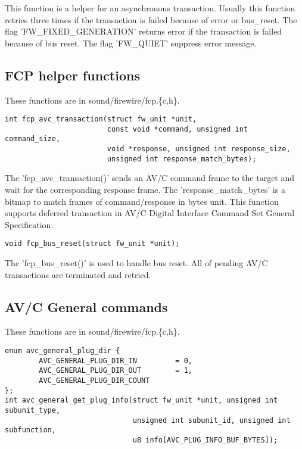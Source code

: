 \documentclass[onecolumn]{article}
\begin{document}
This function is a helper for an asynchronous transaction. Usually this function retries three times if the transaction is failed because of error or bus\_reset. The flag 'FW\_FIXED\_GENERATION' returns error if the transaction is failed because of bus reset. The flag 'FW\_QUIET' suppress error message.

\subsection{FCP helper functions}

These functions are in sound/firewire/fcp.\{c,h\}.

\begin{verbatim}
int fcp_avc_transaction(struct fw_unit *unit,
                        const void *command, unsigned int command_size,
                        void *response, unsigned int response_size,
                        unsigned int response_match_bytes);
\end{verbatim}

The 'fcp\_avc\_transaction()' sends an AV/C command frame to the target and wait for the corresponding response frame. The 'response\_match\_bytes' is a bitmap to match frames of command/response in bytes unit. This function supports deferred transaction in AV/C Digital Interface Command Set General Specification.

\begin{verbatim}
void fcp_bus_reset(struct fw_unit *unit);
\end{verbatim}

The 'fcp\_bus\_reset()' is used to handle bus reset. All of pending AV/C transactions are terminated and retried. 


\subsection{AV/C General commands}

These functions are in sound/firewire/fcp.\{c,h\}.

\begin{verbatim}
enum avc_general_plug_dir {
        AVC_GENERAL_PLUG_DIR_IN         = 0,
        AVC_GENERAL_PLUG_DIR_OUT        = 1,
        AVC_GENERAL_PLUG_DIR_COUNT
};
int avc_general_get_plug_info(struct fw_unit *unit, unsigned int subunit_type,
                              unsigned int subunit_id, unsigned int subfunction,
                              u8 info[AVC_PLUG_INFO_BUF_BYTES]);
\end{verbatim}
\end{document}
